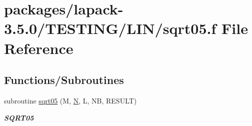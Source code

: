 \hypertarget{sqrt05_8f}{}\section{packages/lapack-\/3.5.0/\+T\+E\+S\+T\+I\+N\+G/\+L\+I\+N/sqrt05.f File Reference}
\label{sqrt05_8f}
\subsection*{Functions/\+Subroutines}
\begin{DoxyCompactItemize}
\item 
subroutine \hyperlink{group__single__lin_gafa5bdb34d3d7382c7a17d5977aef8aca}{sqrt05} (M, \hyperlink{polmisc_8c_a0240ac851181b84ac374872dc5434ee4}{N}, L, N\+B, R\+E\+S\+U\+L\+T)
\begin{DoxyCompactList}\small\item\em {\bfseries S\+Q\+R\+T05} \end{DoxyCompactList}\end{DoxyCompactItemize}
